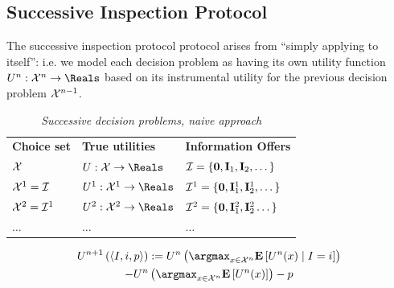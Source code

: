 \subsection{Successive Inspection Protocol}
\label{app:naive}

The successive inspection protocol protocol arises from ``simply applying \citet{weissRedesigningInformationMarkets2024} to itself'': i.e. we model each decision problem as having its own utility function $U^n:\Actions^n\to\Reals$ based on its instrumental utility for the previous decision problem $\mathcal{X}^{n-1}$.


\begin{table}[h]
\centering
\caption{\emph{Successive decision problems, naive approach}}
\vspace{0.2em}
\label{tab:sdp}
\begin{tabular}{lll}
\vspace{0.2em}
\textbf{Choice set} & \textbf{True utilities} & \textbf{Information Offers} \\

\vspace{0.2em}
$\mathcal{X}$ & $U:\Actions\to\Reals$ & $\mathcal{I}=\{\mathbf{0},\mathbf{I}_1,\mathbf{I}_2,\dots\}$ \\

\vspace{0.2em}
$\mathcal{X}^1=\mathcal{I}$ & $U^1:\Actions^1\to\Reals$ & $\mathcal{I}^1=\{\mathbf{0},\mathbf{I}^1_1,\mathbf{I}^1_2,\dots\}$ \\

\vspace{0.2em}
$\mathcal{X}^2=\mathcal{I}^1$ & $U^2:\Actions^2\to\Reals$ & $\mathcal{I}^2=\{\mathbf{0},\mathbf{I}^2_1,\mathbf{I}^2_2\dots\}$ \\
$\dots$ & $\dots$ & $\dots$ \\
\end{tabular}
\end{table}

\begin{multline}
U^{n+1}\left(\langle I, i, p\rangle\right) := U^n\left(\argmax_{x\in\Actions^n}\Expectof{U^n(x)\mid I=i}\right) \\
- U^n\left(\argmax_{x\in\Actions^n}\Expectof{U^n(x)}\right) - p
\label{eq:voi-rim}
\end{multline}

